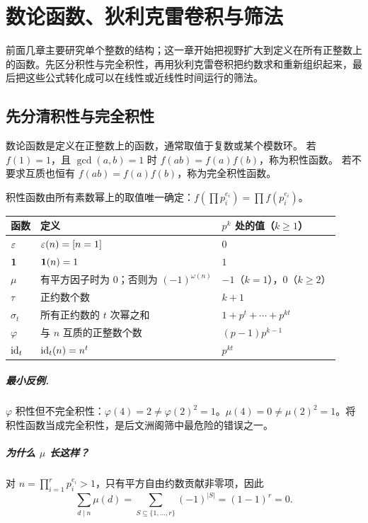 

\chapter{数论函数、狄利克雷卷积与筛法}
\begin{chapterintro}[章节导读]
前面几章主要研究单个整数的结构；这一章开始把视野扩大到定义在所有正整数上的函数。先区分积性与完全积性，再用狄利克雷卷积把约数求和重新组织起来，最后把这些公式转化成可以在线性或近线性时间运行的筛法。
\end{chapterintro}

\section{先分清积性与完全积性}
\begin{definition}
数论函数是定义在正整数上的函数，通常取值于复数或某个模数环。
若 $f(1)=1$，且 $\gcd(a,b)=1$ 时 $f(ab)=f(a)f(b)$，称为积性函数。
若不要求互质也恒有 $f(ab)=f(a)f(b)$，称为完全积性函数。
\end{definition}
积性函数由所有素数幂上的取值唯一确定：$f(\prod p_i^{e_i})=\prod f(p_i^{e_i})$。

\begin{longtable}{p{}p{}p{}}
\toprule
函数 & 定义 & $p^k$ 处的值（$k\ge1$）\\\midrule
$\varepsilon$ & $\varepsilon(n)=[n=1]$ & $0$\\
$\mathbf 1$ & $\mathbf 1(n)=1$ & $1$\\
$\mu$ & 有平方因子时为 $0$；否则为 $(-1)^{\omega(n)}$ & $-1$（$k=1$），$0$（$k\ge2$）\\
$\tau$ & 正约数个数 & $k+1$\\
$\sigma_t$ & 所有正约数的 $t$ 次幂之和 & $1+p^t+\cdots+p^{kt}$\\
$\varphi$ & 与 $n$ 互质的正整数个数 & $(p-1)p^{k-1}$\\
$\operatorname{id}_t$ & $\operatorname{id}_t(n)=n^t$ & $p^{kt}$\\
\bottomrule
\end{longtable}

\paragraph{最小反例.} $\varphi$ 积性但不完全积性：$\varphi(4)=2\ne\varphi(2)^2=1$。$\mu(4)=0\ne\mu(2)^2=1$。将积性函数当成完全积性，是后文洲阁筛中最危险的错误之一。
\paragraph{为什么 $\mu$ 长这样？}
对 $n=\prod_{i=1}^r p_i^{e_i}>1$，只有平方自由约数贡献非零项，因此
\[
 \sum_{d\mid n}\mu(d)=\sum_{S\subseteq\{1,\ldots,r\}}(-1)^{|S|}=(1-1)^r=0.
\]

